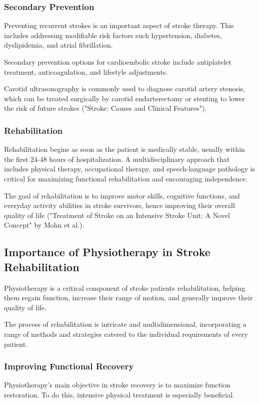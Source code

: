 \subsubsection{Secondary Prevention}
\label{sec:intstrokeunits}
Preventing recurrent strokes is an important aspect of stroke therapy. This includes addressing modifiable risk factors such hypertension, diabetes, dyslipidemia, and atrial fibrillation. 


Secondary prevention options for cardioembolic stroke include antiplatelet treatment, anticoagulation, and lifestyle adjustments. 


Carotid ultrasonography is commonly used to diagnose carotid artery stenosis, which can be treated surgically by carotid endarterectomy or stenting to lower the risk of future strokes ("Stroke: Causes and Clinical Features").

\subsubsection{Rehabilitation}
\label{sec:rehabilitation}
Rehabilitation begins as soon as the patient is medically stable, usually within the first 24-48 hours of hospitalization. A multidisciplinary approach that includes physical therapy, occupational therapy, and speech-language pathology is critical for maximizing functional rehabilitation and encouraging independence. 


The goal of rehabilitation is to improve motor skills, cognitive functions, and everyday activity abilities in stroke survivors, hence improving their overall quality of life ("Treatment of Stroke on an Intensive Stroke Unit: A Novel Concept" by Mohn et al.).

\subsection{Importance of Physiotherapy in Stroke Rehabilitation}
\label{sec:physiotherapy}
Physiotherapy is a critical component of stroke patients rehabilitation, helping them regain function, increase their range of motion, and generally improve their quality of life. 

The process of rehabilitation is intricate and multidimensional, incorporating a range of methods and strategies catered to the individual requirements of every patient.

\subsubsection{Improving Functional Recovery}
\label{sec:improvingfunctionalrecovery}
Physiotherapy's main objective in stroke recovery is to maximize function restoration. To do this, intensive physical treatment is especially beneficial.


